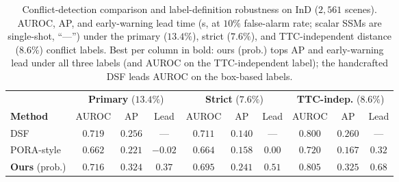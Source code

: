 \documentclass[journal]{IEEEtran}
\begin{document}
\begin{table}[t]
\caption{Conflict-detection comparison and label-definition robustness on InD ($2{,}561$ scenes). AUROC, AP, and early-warning lead time (s, at $10\%$ false-alarm rate; scalar SSMs are single-shot, ``---'') under the primary ($13.4\%$), strict ($7.6\%$), and TTC-independent distance ($8.6\%$) conflict labels. Best per column in bold: ours (prob.) tops AP and early-warning lead under all three labels (and AUROC on the TTC-independent label); the handcrafted DSF leads AUROC on the box-based labels.}
\label{tab:robust}
\centering
\footnotesize
\setlength{\tabcolsep}{4.5pt}
\begin{tabular}{l ccc ccc ccc}
\toprule
& \multicolumn{3}{c}{\textbf{Primary} ($13.4\%$)} & \multicolumn{3}{c}{\textbf{Strict} ($7.6\%$)} & \multicolumn{3}{c}{\textbf{TTC-indep.} ($8.6\%$)} \\
\cmidrule(lr){2-4}\cmidrule(lr){5-7}\cmidrule(lr){8-10}
\textbf{Method} & AUROC & AP & Lead & AUROC & AP & Lead & AUROC & AP & Lead \\
\midrule
DSF \cite{4,6}          & $\mathbf{0.719}$ & $0.256$ & --- & $\mathbf{0.711}$ & $0.140$ & --- & $0.800$ & $0.260$ & --- \\
PORA-style \cite{wang2025dynamic}  & $0.662$ & $0.221$ & $-0.02$ & $0.664$ & $0.158$ & $0.00$ & $0.720$ & $0.167$ & $0.32$ \\
\midrule
\textbf{Ours} (prob.)   & $0.716$ & $\mathbf{0.324}$ & $\mathbf{0.37}$ & $0.695$ & $\mathbf{0.241}$ & $\mathbf{0.51}$ & $\mathbf{0.805}$ & $\mathbf{0.325}$ & $\mathbf{0.68}$ \\
\bottomrule
\end{tabular}
\end{table}
\end{document}
